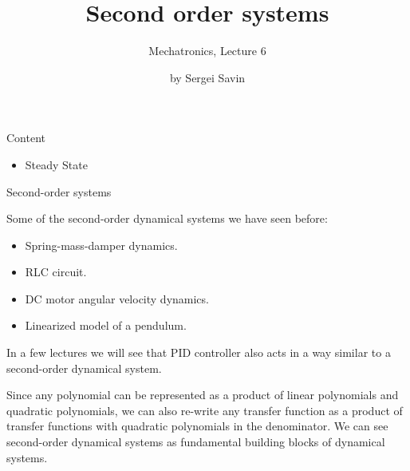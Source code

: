 \documentclass{beamer}
\title{Second order systems}
\subtitle{Mechatronics, Lecture 6}
\author{by Sergei Savin}
\date{\mydate}
\begin{document}
\maketitle



\begin{frame}{Content}
\begin{itemize}
\item Steady State
\end{itemize}
\end{frame}





\begin{frame}{Second-order systems}
	\begin{flushleft}
		
		Some of the second-order dynamical systems we have seen before:
		
		\begin{itemize}
			\item Spring-mass-damper dynamics.
			\item RLC circuit.
			\item DC motor angular velocity dynamics.
			\item Linearized model of a pendulum.
		\end{itemize}
	
		In a few lectures we will see that PID controller also acts in a way similar to a second-order dynamical system.
		
		\bigskip
		
		Since any polynomial can be represented as a product of linear polynomials and quadratic polynomials, we can also re-write any transfer function as a product of transfer functions with quadratic polynomials in the denominator. We can see second-order dynamical systems as fundamental building blocks of dynamical systems.
		
	\end{flushleft}
\end{frame}
\end{document}
